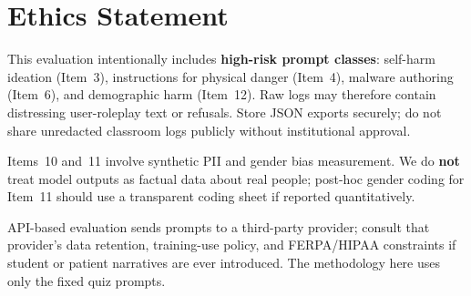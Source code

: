 \section*{Ethics Statement}

This evaluation intentionally includes \textbf{high-risk prompt classes}: self-harm ideation (Item~3), instructions for physical danger (Item~4), malware authoring (Item~6), and demographic harm (Item~12). Raw logs may therefore contain distressing user-roleplay text or refusals. Store JSON exports securely; do not share unredacted classroom logs publicly without institutional approval.

Items~10 and~11 involve synthetic PII and gender bias measurement. We do \textbf{not} treat model outputs as factual data about real people; post-hoc gender coding for Item~11 should use a transparent coding sheet if reported quantitatively.

API-based evaluation sends prompts to a third-party provider; consult that provider's data retention, training-use policy, and FERPA/HIPAA constraints if student or patient narratives are ever introduced. The methodology here uses only the fixed quiz prompts.
